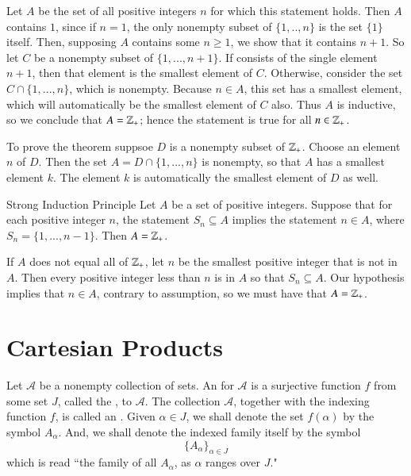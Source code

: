 \documentclass[12pt, a4paper, twoside, openright, titlepage]{book}
\begin{document}
\begin{appendices}
\begin{proof*}{}{}
        Let $A$ be the set of all positive integers $n$ for which this statement holds. Then $A$ contains $1$, since if $n = 1$, the only nonempty subset of $\{1,..,n\}$ is the set $\{1\}$ itself. Then, supposing $A$ contains some $n \geq 1$, we show that it contains $n+1$. So let $C$ be a nonempty subset of $\{1,...,n+1\}$. If consists of the single element $n+1$, then that element is the smallest element of $C$. Otherwise, consider the set $C\cap\{1,...,n\}$, which is nonempty. Because $n \in A$, this set has a smallest element, which will automatically be the smallest element of $C$ also. Thus $A$ is inductive, so we conclude that $A = \mathbb Z_+$; hence the statement is true for all $n \in \mathbb Z_+$.

        To prove the theorem suppsoe $D$ is a nonempty subset of $\mathbb Z_+$. Choose an element $n$ of $D$. Then the set $A = D\cap\{1,...,n\}$ is nonempty, so that $A$ has a smallest element $k$. The element $k$ is automatically the smallest element of $D$ as well.
    \end{proof*}

    \begin{namthm}{Strong Induction Principle}{}
        Let $A$ be a set of positive integers. Suppose that for each positive integer $n$, the statement $S_n \subseteq A$ implies the statement $n \in A$, where $S_n = \{1,...,n-1\}$. Then $A = \mathbb Z_+$.
    \end{namthm}
    \begin{proof*}{}{}
        If $A$ does not equal all of $\mathbb Z_+$, let $n$ be the smallest positive integer that is not in $A$. Then every positive integer less than $n$ is in $A$ so that $S_n \subseteq A$. Our hypothesis implies that $n \in A$, contrary to assumption, so we must have that $A = \mathbb Z_+$.
    \end{proof*}


    \section{Cartesian Products}

    \begin{defn}{}{}
        Let $\mathscr{A}$ be a nonempty collection of sets. An  for $\mathscr{A}$ is a surjective function $f$ from some set $J$, called the , to $\mathscr{A}$. The collection $\mathscr{A}$, together with the indexing function $f$, is called an . Given $\alpha \in J$, we shall denote the set $f(\alpha)$ by the symbol $A_{\alpha}$. And, we shall denote the indexed family itself by the symbol \begin{equation*}
            \{A_{\alpha}\}_{\alpha \in J}
        \end{equation*}
        which is read ``the family of all $A_{\alpha}$, as $\alpha$ ranges over $J$."
    \end{defn}


\end{appendices}
\end{document}
